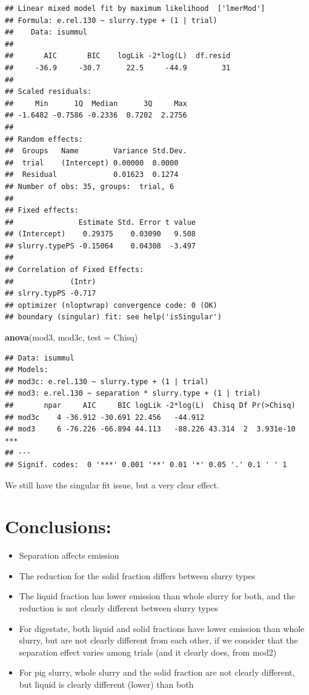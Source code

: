 \documentclass[
]{article}
\newenvironment{Shaded}{\begin{snugshade}}{\end{snugshade}}
\newcommand{\AttributeTok}[1]{\textcolor[rgb]{0.13,0.29,0.53}{#1}}
\newcommand{\FunctionTok}[1]{\textcolor[rgb]{0.13,0.29,0.53}{\textbf{#1}}}
\newcommand{\NormalTok}[1]{#1}
\newcommand{\StringTok}[1]{\textcolor[rgb]{0.31,0.60,0.02}{#1}}
\providecommand{\tightlist}{%
  \setlength{\itemsep}{0pt}\setlength{\parskip}{0pt}}
\begin{document}
\begin{verbatim}
## Linear mixed model fit by maximum likelihood  ['lmerMod']
## Formula: e.rel.130 ~ slurry.type + (1 | trial)
##    Data: isummul
## 
##       AIC       BIC    logLik -2*log(L)  df.resid 
##     -36.9     -30.7      22.5     -44.9        31 
## 
## Scaled residuals: 
##     Min      1Q  Median      3Q     Max 
## -1.6482 -0.7586 -0.2336  0.7202  2.2756 
## 
## Random effects:
##  Groups   Name        Variance Std.Dev.
##  trial    (Intercept) 0.00000  0.0000  
##  Residual             0.01623  0.1274  
## Number of obs: 35, groups:  trial, 6
## 
## Fixed effects:
##               Estimate Std. Error t value
## (Intercept)    0.29375    0.03090   9.508
## slurry.typePS -0.15064    0.04308  -3.497
## 
## Correlation of Fixed Effects:
##             (Intr)
## slrry.typPS -0.717
## optimizer (nloptwrap) convergence code: 0 (OK)
## boundary (singular) fit: see help('isSingular')
\end{verbatim}

\begin{Shaded}
\begin{Highlighting}[]
\FunctionTok{anova}\NormalTok{(mod3, mod3c, }\AttributeTok{test =} \StringTok{\textquotesingle{}Chisq\textquotesingle{}}\NormalTok{)}
\end{Highlighting}
\end{Shaded}

\begin{verbatim}
## Data: isummul
## Models:
## mod3c: e.rel.130 ~ slurry.type + (1 | trial)
## mod3: e.rel.130 ~ separation * slurry.type + (1 | trial)
##       npar     AIC     BIC logLik -2*log(L)  Chisq Df Pr(>Chisq)    
## mod3c    4 -36.912 -30.691 22.456   -44.912                         
## mod3     6 -76.226 -66.894 44.113   -88.226 43.314  2  3.931e-10 ***
## ---
## Signif. codes:  0 '***' 0.001 '**' 0.01 '*' 0.05 '.' 0.1 ' ' 1
\end{verbatim}

We still have the singular fit issue, but a very clear effect.

\section{Conclusions:}\label{conclusions}

\begin{itemize}
\tightlist
\item
  Separation affects emission
\item
  The reduction for the solid fraction differs between slurry types
\item
  The liquid fraction has lower emission than whole slurry for both, and
  the reduction is not clearly different between slurry types
\item
  For digestate, both liquid and solid fractions have lower emission
  than whole slurry, but are not clearly different from each other, if
  we consider that the separation effect varies among trials (and it
  clearly does, from mod2)
\item
  For pig slurry, whole slurry and the solid fraction are not clearly
  different, but liquid is clearly different (lower) than both
\end{itemize}
\end{document}
